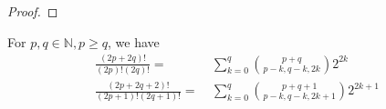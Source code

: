 \begin{proof}
\end{proof}
\begin{lemma} \label{thm:multinomial-identities}
	For $p,q\in\mathbb{N}, p\ge q$, we have
	\begin{align}
	\frac{(2p+2q)!}{(2p)!(2q)!} = &~ \sum_{k=0}^{q} \binom{p+q}{p-k, q-k, 2k}2^{2k} \\
	\frac{(2p+2q+2)!}{(2p+1)!(2q+1)!} = &~ \sum_{k=0}^{q} \binom{p+q+1}{p-k, q-k, 2k+1}2^{2k+1}
	\end{align}
\end{lemma}
